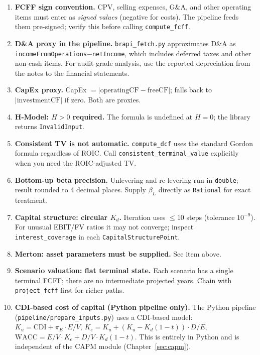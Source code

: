 \documentclass[12pt, a4paper, oneside]{book}
\newcommand{\WACC}{\ensuremath{\mathrm{WACC}}}
\newcommand{\Ke}{K_e}
\newcommand{\Kd}{K_d}
\newcommand{\Ku}{K_u}
\begin{document}
\begin{enumerate}[leftmargin=*, label=\textbf{\arabic*.}]

\item \textbf{FCFF sign convention.}
  CPV, selling expenses, G\&A, and other operating items must enter as
  \emph{signed values} (negative for costs).  The pipeline feeds them
  pre-signed; verify this before calling \texttt{compute\_fcff}.

\item \textbf{D\&A proxy in the pipeline.}
  \texttt{brapi\_fetch.py} approximates D\&A as
  \texttt{incomeFromOperations}$-$\texttt{netIncome}, which includes
  deferred taxes and other non-cash items.  For audit-grade analysis,
  use the reported depreciation from the notes to the financial
  statements.

\item \textbf{CapEx proxy.}
  CapEx $= |\text{operatingCF}-\text{freeCF}|$;
  falls back to $|\text{investmentCF}|$ if zero.  Both are proxies.

\item \textbf{H-Model: $H > 0$ required.}
  The formula is undefined at $H=0$; the library returns
  \texttt{InvalidInput}.

\item \textbf{Consistent TV is not automatic.}
  \texttt{compute\_dcf} uses the standard Gordon formula regardless of
  ROIC.  Call \texttt{consistent\_terminal\_value} explicitly when you
  need the ROIC-adjusted TV.

\item \textbf{Bottom-up beta precision.}
  Unlevering and re-levering run in \texttt{double}; result rounded to
  4 decimal places.  Supply $\beta_L$ directly as \texttt{Rational}
  for exact treatment.

\item \textbf{Capital structure: circular $\Kd$.}
  Iteration uses $\leq 10$ steps (tolerance $10^{-9}$).  For unusual
  EBIT/FV ratios it may not converge; inspect \texttt{interest\_coverage}
  in each \texttt{CapitalStructurePoint}.

\item \textbf{Merton: asset parameters must be supplied.}
  See item above.

\item \textbf{Scenario valuation: flat terminal state.}
  Each scenario has a single terminal FCFF; there are no intermediate
  projected years.  Chain with \texttt{project\_fcff} first for richer
  paths.

\item \textbf{CDI-based cost of capital (Python pipeline only).}
  The Python pipeline (\texttt{pipeline/prepare\_inputs.py}) uses a
  CDI-based model:
  $\Ku = \mathrm{CDI} + \pi_E\cdot E/V$,
  $\Ke = \Ku + (\Ku-\Kd(1-t))\cdot D/E$,
  $\WACC = E/V\cdot\Ke + D/V\cdot\Kd(1-t)$.
  This is entirely in Python and is independent of the CAPM module
  (Chapter~\ref{sec:capm}).

\end{enumerate}
\end{document}
